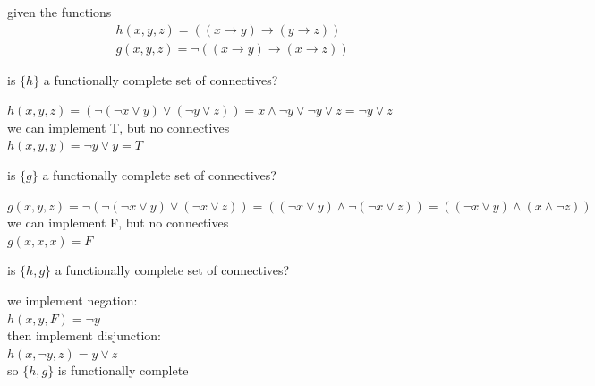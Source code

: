 \documentclass[a4paper,12pt]{article}
\begin{document}
\begin{question}
given the functions\\
\begin{gather*}
  h(x,y,z) = ((x \to y) \to (y \to z))\\
  g(x,y,z) = \lnot ((x \to y) \to (x \to z))
\end{gather*}
\begin{subquestion}
is \(\{h\}\) a functionally complete set of connectives?\\
\begin{answer}
\(h(x,y,z) = (\lnot (\lnot x \lor y) \lor (\lnot y \lor z)) = x \land \lnot y \lor \lnot y \lor z = \lnot y \lor z\)\\
we can implement T, but no connectives\\
\(h(x,y,y) = \lnot y \lor y = T\)\\
\end{answer}
\end{subquestion}
\begin{subquestion}
is \(\{g\}\) a functionally complete set of connectives?\\
\begin{answer}
\(g(x,y,z) = \lnot (\lnot (\lnot x \lor y) \lor (\lnot x \lor z)) = ((\lnot x \lor y) \land \lnot (\lnot x \lor z)) = ((\lnot x \lor y) \land (x \land \lnot z))\)\\
we can implement F, but no connectives\\
\(g(x,x,x)=F\)\\
\end{answer}
\end{subquestion}
\begin{subquestion}
is \(\{h,g\}\) a functionally complete set of connectives?\\
\begin{answer}
we implement negation:\\
\(h(x,y,F)=\lnot y\)\\
then implement disjunction:\\
\(h(x,\lnot y,z)=y \lor z\)\\
so \(\{h,g\}\) is functionally complete\\
\end{answer}
\end{subquestion}
\end{question}
\end{document}
